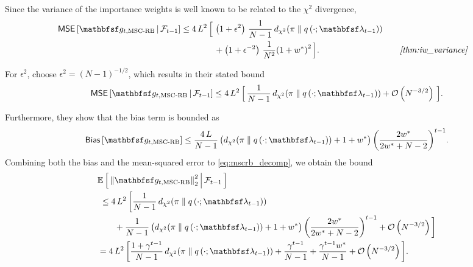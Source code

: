 \begin{proofEnd}
  Since the variance of the importance weights is well known to be related to the \(\chi^2\) divergence,
  \begin{alignat}{2}
    \mathsf{MSE}\left[ \rvvg_{t,\text{MSC-RB}} \,\middle|\, \mathcal{F}_{t-1} \right] \leq
    4\,L^2 \, \Big[\,&
     \left( 1 + \epsilon^2 \right)\, \frac{1}{N-1}\,\DChi{\pi}{q\left(\cdot; \rvvlambda_{t-1}\right)}
    \nonumber
     \\
     &+
     \left(1 + \epsilon^{-2} \right)\, \frac{1}{N^2} {\left(1 + w^*\right)}^2 
    \,\Big].
    &&\quad\text{\textit{\cref{thm:iw_variance}}}
    \nonumber
  \end{alignat}

  For \(\epsilon^2\), \citeauthor{cardoso_brsnis_2022} choose \(\epsilon^2 = {\left(N-1\right)}^{-1/2}\), which results in their stated bound
  \begin{align*}
    \mathsf{MSE}\left[ \rvvg_{t,\text{MSC-RB}} \,\middle|\, \mathcal{F}_{t-1} \right] \leq
    4\,L^2 \, \Big[\,
      \frac{1}{N-1}\,\DChi{\pi}{q\left(\cdot; \rvvlambda_{t-1}\right)}
      +
      \mathcal{O}\left(N^{-3/2}\right)
    \,\Big].
  \end{align*}

  Furthermore, they show that the bias term is bounded as
  \begin{align*}
    \mathsf{Bias}\left[ \rvvg_{t,\text{MSC-RB}} \right]
    \leq
    \frac{4 \, L}{N-1} \left( \DChi{\pi}{q\left(\cdot; \rvvlambda_{t-1}\right)} + 1 + w^*\right) {\left( \frac{2 w^*}{ 2 w^* + N - 2 } \right)}^{t-1}.
  \end{align*}
  Combining both the bias and the mean-squared error to \cref{eq:mscrb_decomp}, we obtain the bound
  \begin{align*}
    &\E{ {\lVert \rvvg_{t,\text{MSC-RB}} \rVert}_2^2 \,\middle|\, \mathcal{F}_{t-1} }
    \\
    &\;\leq 
    4\,L^2\,\bigg[
    \frac{1}{N-1}\,\DChi{\pi}{q\left(\cdot; \rvvlambda_{t-1}\right)}
    \\
    &\qquad+
    \frac{1}{N-1} \left( \DChi{\pi}{q\left(\cdot; \rvvlambda_{t-1}\right)} + 1 + w^*\right) {\left( \frac{2 w^*}{ 2 w^* + N - 2 } \right)}^{t-1}
    +
    \mathcal{O}\left(N^{-3/2}\right)
    \bigg]
    \\
    &=
    4 \, L^2 \,\bigg[
    \frac{1 + \gamma^{t-1}}{N-1}\,\DChi{\pi}{q\left(\cdot; \rvvlambda_{t-1}\right)} + \frac{\gamma^{t-1}}{N-1} + \frac{\gamma^{t-1} w^*}{N-1}
    +
    \mathcal{O}\left(N^{-3/2}\right)
    \bigg].
  \end{align*}
\end{proofEnd}


